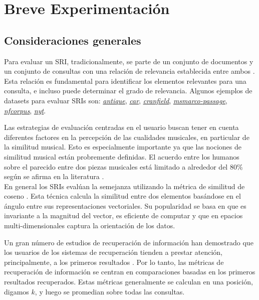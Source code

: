\chapter{Breve Experimentación}
\label{chap:experiment}

\section{Consideraciones generales}
\label{sec:consid}
Para evaluar un SRI, tradicionalmente, se parte de un conjunto de documentos y un conjunto de consultas con una relación de relevancia establecida entre ambos \cite{manning2008introductiontoIR}. Esta relación es fundamental para identificar los elementos relevantes para una consulta, e incluso puede determinar el grado de relevancia. Algunos ejemplos de datasets para evaluar SRIs son: \href{https://ir-datasets.com/antique.html}{\textit{antique}}, \href{https://ir-datasets.com/car.html}{\textit{car}}, \href{https://ir-datasets.com/cranfield.html}{\textit{cranfield}}, \href{https://ir-datasets.com/msmarco-passage.html}{\textit{msmarco-passage}}, \href{https://ir-datasets.com/nfcorpus.html}{\textit{nfcorpus}}, \href{https://ir-datasets.com/nyt.html}{\textit{nyt}}.

Las estrategias de evaluación centradas en el usuario buscan tener en cuenta diferentes factores en la percepción de las cualidades musicales, en particular de la similitud musical. Esto es especialmente importante ya que las nociones de similitud musical están probremente definidas. El acuerdo entre los humanos sobre el parecido entre dos piezas musicales está limitado a alrededor del 80\% según se afirma en la literatura \cite{Schedl2014MusicIR}.\\
En general los SRIs evalúan la semejanza utilizando la métrica de similitud de coseno \cite{Brundha2022VectorMB}. Esta técnica calcula la similitud entre dos elementos basándose en el ángulo entre sus representaciones vectoriales. Su popularidad se basa en que es invariante a la magnitud del vector, es eficiente de computar y que en epacios multi-dimensionales captura la orientación de los datos.

Un gran número de estudios de recuperación de información han demostrado que los usuarios de los sistemas de recuperación tienden a prestar atención, principalmente, a los primeros resultados \cite{Mitra2017NeuralMF}. Por lo tanto, las métricas de recuperación de información se centran en comparaciones basadas en los primeros resultados recuperados. Estas métricas generalmente se calculan en una posición, digamos $k$, y luego se promedian sobre todas las consultas.

